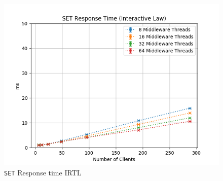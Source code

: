 \documentclass[11pt,a4paper]{article}
\begin{document}
%
\begin{figure}[H]
	\centering
    \begin{minipage}{0.5\textwidth}
        \includegraphics[width=\textwidth]{../illustrations/plots/3_1_full_system_write/1-0/middleware_interactive_set_rt_ms.png}
        \caption{\texttt{SET} Response time IRTL}
        \label{fig:full_system_write_set_rt_it}
    \end{minipage}\hfill
\end{figure}
%
\end{document}
